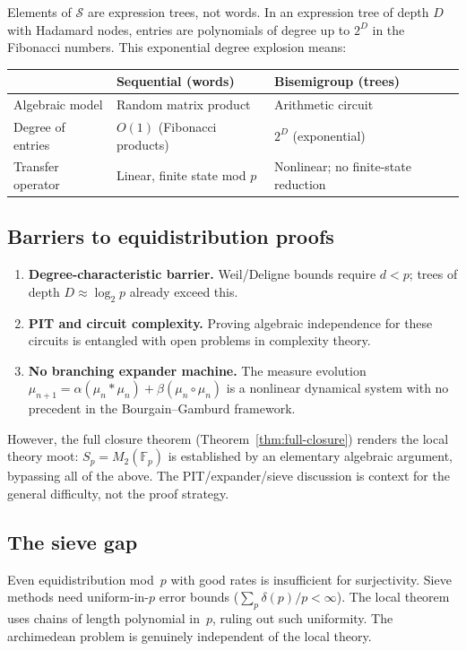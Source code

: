 \documentclass[11pt,a4paper]{article}
\theoremstyle{definition}
\theoremstyle{remark}
\newcommand{\FF}{\mathbb{F}}
\newcommand{\cS}{\mathcal{S}}
\begin{document}
Elements of $\cS$ are expression trees, not words. In an expression tree of depth $D$ with Hadamard nodes, entries are polynomials of degree up to $2^D$ in the Fibonacci numbers. This exponential degree explosion means:

\begin{center}
\begin{tabular}{lll}
\toprule
 & Sequential (words) & Bisemigroup (trees) \\
\midrule
Algebraic model & Random matrix product & Arithmetic circuit \\
Degree of entries & $O(1)$ (Fibonacci products) & $2^D$ (exponential) \\
Transfer operator & Linear, finite state mod $p$ & Nonlinear; no finite-state reduction \\
\bottomrule
\end{tabular}
\end{center}

\subsection{Barriers to equidistribution proofs}

\begin{enumerate}
  \item \textbf{Degree-characteristic barrier.} Weil/Deligne bounds require $d < p$; trees of depth $D \approx \log_2 p$ already exceed this.
  \item \textbf{PIT and circuit complexity.} Proving algebraic independence for these circuits is entangled with open problems in complexity theory.
  \item \textbf{No branching expander machine.} The measure evolution $\mu_{n+1} = \alpha(\mu_n * \mu_n) + \beta(\mu_n \circ \mu_n)$ is a nonlinear dynamical system with no precedent in the Bourgain--Gamburd framework.
\end{enumerate}

However, the full closure theorem (Theorem~\ref{thm:full-closure}) renders the local theory moot: $S_p = M_2(\FF_p)$ is established by an elementary algebraic argument, bypassing all of the above. The PIT/expander/sieve discussion is context for the general difficulty, not the proof strategy.

\subsection{The sieve gap}

Even equidistribution mod~$p$ with good rates is insufficient for surjectivity. Sieve methods need uniform-in-$p$ error bounds ($\sum_p \delta(p)/p < \infty$). The local theorem uses chains of length polynomial in~$p$, ruling out such uniformity. The archimedean problem is genuinely independent of the local theory.
\end{document}

